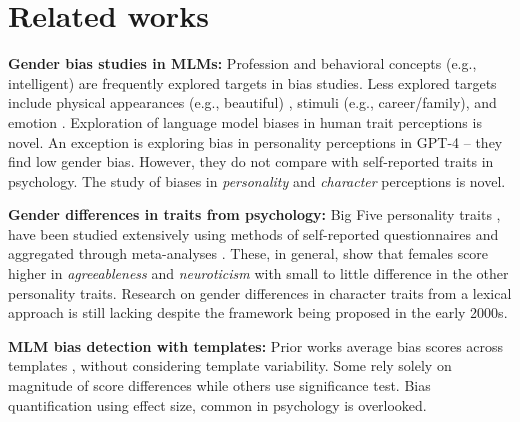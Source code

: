 \section{Related works}

\noindent \textbf{Gender bias studies in MLMs:} 
%
Profession \cite{limisiewicz-marecek-2022-dont, bartl-etal-2020-unmasking} and behavioral concepts (e.g., intelligent) 
\cite{guo2022auto,ahn-oh-2021-mitigating} are frequently explored targets in bias studies.
%
Less explored targets include physical appearances (e.g., beautiful) \cite{kaneko2022unmasking,nadeem-etal-2021-stereoset}, stimuli (e.g., career/family),
and emotion \cite{bartl-etal-2020-unmasking}.
%
Exploration of language model biases in human trait perceptions is novel. An exception is \citet{rao-etal-2023-chatgpt} exploring bias in personality perceptions in GPT-4 -- they find low gender bias. 
%
However, they do not compare with self-reported traits in psychology. The study of biases in \textit{personality} and \textit{character} perceptions is novel. 

\vspace{0.5em}
\noindent \textbf{Gender differences in traits from psychology:} Big Five personality traits  \cite{goldberg1992development}, have been studied extensively \cite{hartmann2023big,ock2020practical,russo2020gender,kusnierz2020examining,lippa2010gender}
%
using methods of self-reported questionnaires
and aggregated through meta-analyses \cite{lippa2010gender,feingold1994gender}.
%
These, in general, show that females score higher in \textit{agreeableness} and \textit{neuroticism} with small to little difference in the other personality traits.
%
Research on gender differences in character traits from a lexical approach is still lacking despite the framework being proposed in the early 2000s.

\vspace{0.5em}
\noindent \textbf{MLM bias detection with templates:}  
%
Prior works average bias scores across templates 
\cite{limisiewicz-marecek-2022-dont,bartl-etal-2020-unmasking}, without considering template variability.
%
Some rely solely on magnitude of score differences while others \cite{steed2022upstream,bartl-etal-2020-unmasking,kurita-etal-2019-measuring} use significance test.
%
Bias quantification using effect size, common in psychology is overlooked.
